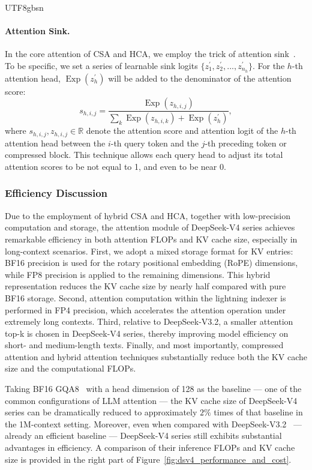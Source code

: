 \documentclass[11pt, a4paper, logo, copyright, nonumbering]{deepseek}
\newcommand{\dsviiiII}{DeepSeek-V3.2}
\newcommand{\dsviv}{DeepSeek-V4}
\newcommand{\hca}{HCA}
\newcommand{\csa}{CSA}
\begin{document}
\begin{CJK*}{UTF8}{gbsn}
\paragraph{Attention Sink.}
In the core attention of \csa{} and \hca{}, we employ the trick of attention sink~\citep{attn_sink,gpt_oss}. 
To be specific, we set a series of learnable sink logits $\{z^{\prime}_1, z^{\prime}_2, ..., z^{\prime}_{n_h}\}$. 
For the $h$-th attention head, $\operatorname{Exp}(z^{\prime}_h)$ will be added to the denominator of the attention score:
\begin{equation}
    s_{h, i, j} = \frac{\operatorname{Exp}(z_{h, i, j})}{\sum_k \operatorname{Exp}(z_{h, i, k}) + \operatorname{Exp}(z^{\prime}_h)},
\end{equation}
where $s_{h, i, j}, z_{h, i, j} \in \mathbb{R}$ denote the attention score and attention logit of the $h$-th attention head between the $i$-th query token and the $j$-th preceding token or compressed block.
This technique allows each query head to adjust its total attention scores to be not equal to 1, and even to be near 0.

\subsubsection{Efficiency Discussion}

Due to the employment of hybrid \csa{} and \hca{}, together with low-precision computation and storage, the attention module of \dsviv{} series achieves remarkable efficiency in both attention FLOPs and KV cache size, especially in long-context scenarios. 
First, we adopt a mixed storage format for KV entries: BF16 precision is used for the rotary positional embedding (RoPE) dimensions, while FP8 precision is applied to the remaining dimensions. 
This hybrid representation reduces the KV cache size by nearly half compared with pure BF16 storage. 
Second, attention computation within the lightning indexer is performed in FP4 precision, which accelerates the attention operation under extremely long contexts. 
Third, relative to \dsviiiII{}, a smaller attention top-k is chosen in \dsviv{} series, thereby improving model efficiency on short- and medium-length texts. 
Finally, and most importantly, compressed attention and hybrid attention techniques substantially reduce both the KV cache size and the computational FLOPs. 

Taking BF16 GQA8~\citep{ainslie2023gqa} with a head dimension of 128 as the baseline --- one of the common configurations of LLM attention --- the KV cache size of \dsviv{} series can be dramatically reduced to approximately $2\%$ times of that baseline in the 1M-context setting.
Moreover, even when compared with \dsviiiII{}~\citep{dsv32} --- already an efficient baseline --- \dsviv{} series still exhibits substantial advantages in efficiency. 
A comparison of their inference FLOPs and KV cache size is provided in the right part of Figure~\ref{fig:dsv4_performance_and_cost}.


\end{CJK*}
\end{document}

